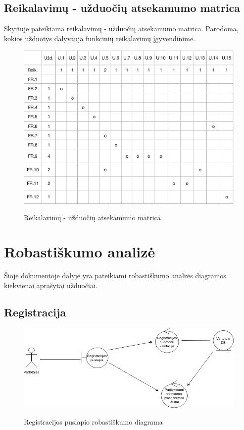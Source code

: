 \documentclass{VUMIFPSkursinis}
\begin{document}
	\subsection{Reikalavimų - užduočių atsekamumo matrica}
	Skyriuje pateikiama reikalavimų - užduočių atsekamumo matrica. Parodoma, kokios užduotys dalyvauja funkcinių reikalavimų įgyvendinime.\\
	\begin{figure}[H]
		\centering
		\includegraphics[width=\linewidth]{img/matrix.png}
		\label{fig:matrix}
		\caption{Reikalavimų - užduočių atsekamumo matrica}
	\end{figure}
	
	\newpage
	
	\section{Robastiškumo analizė}
	Šioje dokumentoje dalyje yra pateikiami robastiškumo analzės diagramos kiekvienai aprašytai užduočiai.
	\subsection{Registracija}
		\begin{figure}[H]
		\centering
		\includegraphics[width=\linewidth]{img/registracija.png}
		\label{fig:registracija}
		\caption{Registracijos puslapio robastiškumo diagrama}
	\end{figure}
\end{document}
